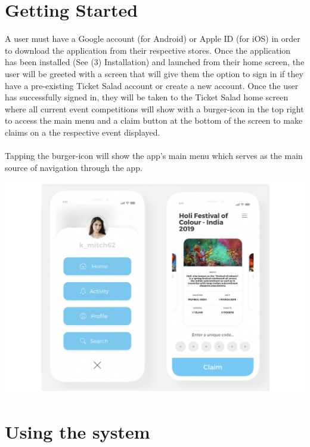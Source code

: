 \documentclass[11pt]{article}
\begin{document}
	\section{Getting Started}
	A user must have a Google account (for Android) or Apple ID (for iOS) in order to download the application
	from their respective stores. Once the application has been installed (See (3) Installation) and launched from
	their home screen, the user will be greeted with a screen that will give them the option to sign in if they have a  	pre-existing Ticket Salad account or create a new account. Once the user has successfully signed in, they will 
	be taken to the Ticket Salad home screen where all current event competitions will show with a burger-icon in the top right to access the main menu and a claim button at the bottom of the screen to make claims on a the respective event displayed.
	\\
	\\
	Tapping the burger-icon will show the app's main menu which serves as the main source of navigation through the app.
	
	\includegraphics[width=\linewidth]{screens.png}

	\section{Using the system}
\end{document}
